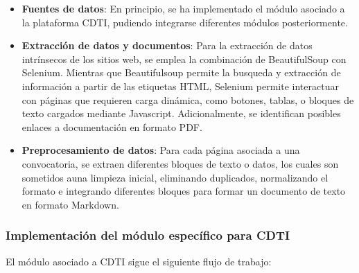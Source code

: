 \begin{itemize}
    \item \textbf{Fuentes de datos}: En principio, se ha implementado el módulo asociado a la plataforma CDTI, pudiendo integrarse diferentes módulos posteriormente.
    \item \textbf{Extracción de datos y documentos}: Para la extracción de datos intrínsecos de los sitios web, se emplea la combinación de BeautifulSoup con Selenium.
    Mientras que Beautifulsoup permite la busqueda y extracción de información a partir de las etiquetas HTML, Selenium permite interactuar con páginas que requieren carga dinámica, como botones, tablas, o bloques de texto cargados mediante Javascript.
    Adicionalmente, se identifican posibles enlaces a documentación en formato PDF.
    \item \textbf{Preprocesamiento de datos}: Para cada página asociada a una convocatoria, se extraen diferentes bloques de texto o datos, los cuales son sometidos  auna limpieza inicial, eliminando duplicados, normalizando el formato e integrando diferentes bloques para formar un documento de texto en formato Markdown.
\end{itemize}



\subsubsection{Implementación del módulo específico para CDTI}

El módulo asociado a CDTI sigue el siguiente flujo de trabajo:

